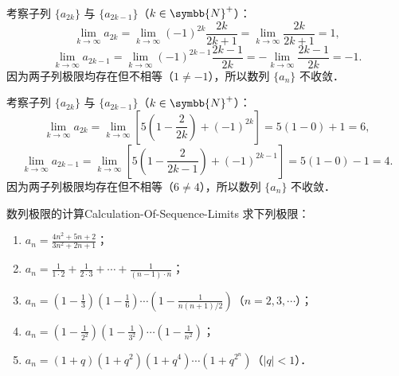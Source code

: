 \begin{myproof}

    考察子列 $\{a_{2k}\}$ 与 $\{a_{2k-1}\}$（$k \in \symbb{N}^+$）：
    \begin{equation}
        \lim_{k\to\infty} a_{2k} = \lim_{k\to\infty} (-1)^{2k} \frac{2k}{2k + 1} = \lim_{k\to\infty} \frac{2k}{2k + 1} = 1,
    \end{equation}
    \begin{equation}
        \lim_{k\to\infty} a_{2k-1} = \lim_{k\to\infty} (-1)^{2k-1} \frac{2k - 1}{2k} = -\lim_{k\to\infty} \frac{2k - 1}{2k} = -1.
    \end{equation}
    因为两子列极限均存在但不相等（$1 \neq -1$），所以数列 $\{a_n\}$ 不收敛．


    考察子列 $\{a_{2k}\}$ 与 $\{a_{2k-1}\}$（$k \in \symbb{N}^+$）：
    \begin{equation}
        \lim_{k\to\infty} a_{2k} = \lim_{k\to\infty} \left[ 5\left( 1 - \frac{2}{2k} \right) + (-1)^{2k} \right] = 5(1 - 0) + 1 = 6,
    \end{equation}
    \begin{equation}
        \lim_{k\to\infty} a_{2k-1} = \lim_{k\to\infty} \left[ 5\left( 1 - \frac{2}{2k - 1} \right) + (-1)^{2k-1} \right] = 5(1 - 0) - 1 = 4.
    \end{equation}
    因为两子列极限均存在但不相等（$6 \neq 4$），所以数列 $\{a_n\}$ 不收敛．
\end{myproof}

\begin{problem}{数列极限的计算}{Calculation-Of-Sequence-Limits}
    求下列极限：
    \begin{enumerate}
        \item $a_n = \frac{4n^2 + 5n + 2}{3n^2 + 2n + 1}$；
        \item $a_n = \frac{1}{1\cdot 2} + \frac{1}{2\cdot 3} + \cdots + \frac{1}{(n-1)\cdot n}$；
        \item $a_n = \left( 1 - \frac{1}{3} \right) \left( 1 - \frac{1}{6} \right) \cdots \left( 1 - \frac{1}{n(n+1)/2} \right)$（$n = 2, 3, \cdots$）；
        \item $a_n = \left( 1 - \frac{1}{2^2} \right) \left( 1 - \frac{1}{3^2} \right) \cdots \left( 1 - \frac{1}{n^2} \right)$；
        \item $a_n = (1 + q)(1 + q^2)(1 + q^4)\cdots(1 + q^{2^n})$（$|q| < 1$）．
    \end{enumerate}
\end{problem}

